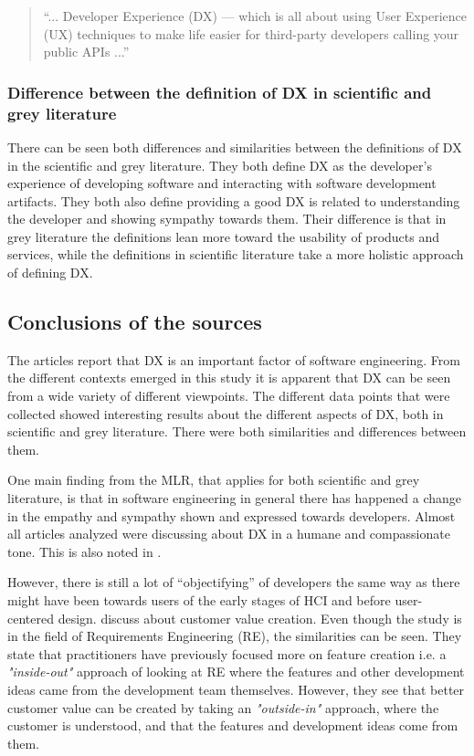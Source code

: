 \documentclass[english, 12pt, a4paper, sci, utf8, a-1b, online]{aaltothesis}
\begin{document}
\begin{quote}
  ``... Developer Experience (DX) — which is all about using User Experience (UX) techniques to make life easier for third-party developers calling your public APIs ...'' \parencite{4-must-read-articles-on-developer-experience}
\end{quote}

\subsubsection{Difference between the definition of DX in scientific and grey literature}

There can be seen both differences and similarities between the definitions of DX in the scientific and grey literature. They both define DX as the developer's experience of developing software and interacting with software development artifacts. They both also define providing a good DX is related to understanding the developer and showing sympathy towards them. Their difference is that in grey literature the definitions lean more toward the usability of products and services, while the definitions in scientific literature take a more holistic approach of defining DX.

\subsection{Conclusions of the sources}

The articles report that DX is an important factor of software engineering. From the different contexts emerged in this study it is apparent that DX can be seen from a wide variety of different viewpoints. The different data points that were collected showed interesting results about the different aspects of DX, both in scientific and grey literature. There were both similarities and differences between them.

One main finding from the MLR, that applies for both scientific and grey literature, is that in software engineering in general there has happened a change in the empathy and sympathy shown and expressed towards developers. Almost all articles analyzed were discussing about DX in a humane and compassionate tone. This is also noted in \textcite{voice-of-the-developer}.

However, there is still a lot of ``objectifying'' of developers the same way as there might have been towards users of the early stages of HCI and before user-centered design. \textcite{kauppinen2009feature} discuss about customer value creation. Even though the study is in the field of Requirements Engineering (RE), the similarities can be seen. They state that practitioners have previously focused more on feature creation i.e. a \textit{"inside-out"} approach of looking at RE where the features and other development ideas came from the development team themselves. However, they see that better customer value can be created by taking an \textit{"outside-in"} approach, where the customer is understood, and that the features and development ideas come from them.
\end{document}

